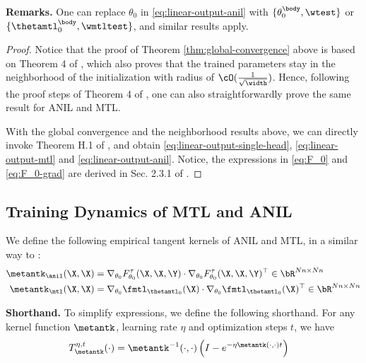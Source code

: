 \documentclass{article}
\begin{document}
\textbf{Remarks.} One can replace $\theta_0$ in \eqref{eq:linear-output-anil} with $\{\theta_0^\body, \wtest\}$ or $\{\thetamtl_0^\body, \wmtltest\}$, and similar results apply.
\begin{proof}
    Notice that the proof of Theorem \ref{thm:global-convergence} above is based on Theorem 4 of \citet{meta-ntk}, which also proves that the trained parameters stay in the neighborhood of the initialization with radius of $\cO(\frac{1}{\sqrt{\width}})$. Hence, following the proof steps of Theorem 4 of \citet{meta-ntk}, one can also straightforwardly prove the same result for ANIL and MTL.

    With the global convergence and the neighborhood results above, we can directly invoke Theorem H.1 of \citet{lee2019wide}, and obtain \eqref{eq:linear-output-single-head}, \eqref{eq:linear-output-mtl} and \eqref{eq:linear-output-anil}. Notice, the expressions in \eqref{eq:F_0} and \eqref{eq:F_0-grad} are derived in Sec. 2.3.1 of \citet{lee2019wide}.
\end{proof}

\subsection{Training Dynamics of MTL and ANIL}\label{supp:proof:dynamics}


\begin{definition} We define the following empirical tangent kernels of ANIL and MTL, in a similar way to \cite{meta-ntk,lee2019wide}:
    \begin{align}
        \metantk_\anil(\X,\X) &= \nabla_{\theta_0} F^\tau_{\theta_0}(\X,\X,\Y) \cdot \nabla_{\theta_0} F^\tau_{\theta_0}(\X,\X,\Y)^\top \in \bR^{Nn \times Nn}\\
        \metantk_\mtl(\X,\X) &= \nabla_{\theta_0} \fmtl_{\thetamtl_0}(\X) \cdot \nabla_{\theta_0} \fmtl_{\thetamtl_0}(\X)^\top \in \bR^{Nn \times Nn}
    \end{align}
\end{definition}

\textbf{Shorthand.} To simplify expressions, we define the following shorthand. For any kernel function $\metantk$, learning rate $\eta$ and optimization steps $t$, we have
\begin{align}
    T^{\eta,t}_{\metantk}(\cdot) &= \metantk^{-1}(\cdot,\cdot) \left(I - e^{-\eta \metantk (\cdot,\cdot) t}\right)
\end{align}
\end{document}
